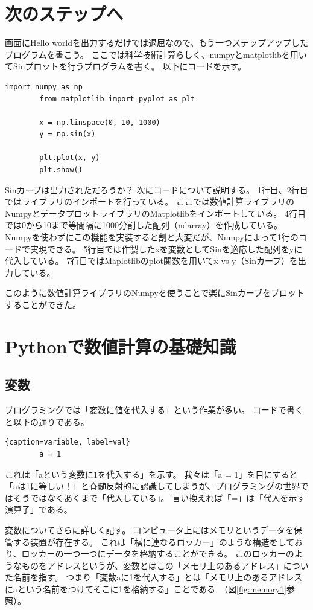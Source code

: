 \documentclass[]{ltjsarticle}
\begin{document}
	\section{次のステップへ}
	画面にHello worldを出力するだけでは退屈なので、もう一つステップアップしたプログラムを書こう。
	ここでは科学技術計算らしく、numpyとmatplotlibを用いてSinプロットを行うプログラムを書く。
	以下にコードを示す。
	\begin{lstlisting}[caption=sin curve, label=sin]
		import numpy as np
		from matplotlib import pyplot as plt

		x = np.linspace(0, 10, 1000)
		y = np.sin(x)

		plt.plot(x, y)
		plt.show()

	\end{lstlisting}
	Sinカーブは出力されただろうか？
	次にコードについて説明する。
	1行目、2行目ではライブラリのインポートを行っている。
	ここでは数値計算ライブラリのNumpyとデータプロットライブラリのMatplotlibをインポートしている。
	4行目では0から10まで等間隔に1000分割した配列（ndarray）を作成している。
	Numpyを使わずにこの機能を実装すると割と大変だが、Numpyによって1行のコードで実現できる。
	5行目では作製したxを変数としてSinを適応した配列をyに代入している。
	7行目ではMaplotlibのplot関数を用いてx vs y（Sinカーブ）を出力している。

	このように数値計算ライブラリのNumpyを使うことで楽にSinカーブをプロットすることができた。

	\section{Pythonで数値計算の基礎知識}
	\subsection{変数}
	プログラミングでは「変数に値を代入する」という作業が多い。
	コードで書くと以下の通りである。
	\begin{lstlisting}{caption=variable, label=val}
		a = 1
	\end{lstlisting}
	これは「aという変数に1を代入する」を示す。
	我々は「a = 1」を目にすると「aは1に等しい！」と脊髄反射的に認識してしまうが、プログラミングの世界ではそうではなくあくまで「代入している」。
	言い換えれば「=」は「代入を示す演算子」である。

	変数についてさらに詳しく記す。
	コンピュータ上にはメモリというデータを保管する装置が存在する。
	これは「横に連なるロッカー」のような構造をしており、ロッカーの一つ一つにデータを格納することができる。
	このロッカーのようなものをアドレスというが、変数とはこの「メモリ上のあるアドレス」についた名前を指す。
	つまり「変数aに1を代入する」とは「メモリ上のあるアドレスにaという名前をつけてそこに1を格納する」ことである~（図\ref{fig:memory1}参照）。
\end{document}
